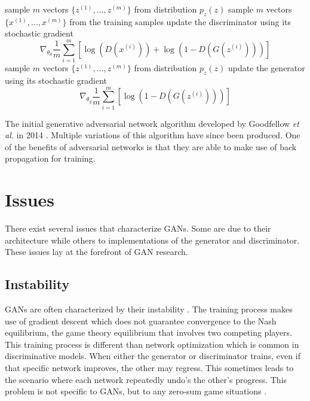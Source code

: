 \documentclass[11pt]{article}
\begin{document}
\begin{algorithm}[H]
  \SetAlgoLined
   \linebreak
   \linebreak
   {
     {
      sample $m$ vectors $\{z^{(1)},...,z^{(m)}\}$ from distribution $p_z(z)$\;
      sample $m$ vectors $\{x^{(1)},...,x^{(m)}\}$ from the training samples\;
      update the discriminator using its stochastic gradient
      $$\nabla_{\theta_d}\frac{1}{m}\sum_{i=1}^{m}[\log(D(x^{(i)}))+\log(1-D(G(z^{(i)})))]$$
    }
    sample $m$ vectors $\{z^{(1)},...,z^{(m)}\}$ from distribution $p_z(z)$\;
    update the generator using its stochastic gradient\;
    $$\nabla_{\theta_g}\frac{1}{m}\sum_{i=1}^{m}[\log(1-D(G(z^{(i)})))]$$
  }
  \caption{The initial generative adversarial network algorithm developed by Goodfellow \textit{et al.} in 2014 \citep{2014arXiv1406.2661G}. Multiple variations of this algorithm have since been produced. One of the benefits of adversarial networks is that they are able to make use of back propagation for training.}
\end{algorithm}



\section{Issues}
There exist several issues that characterize GANs. Some are due to their architecture while others to implementations of the generator and discriminator. These issues lay at the forefront of GAN research.

\subsection{Instability} \label{sec:instability}
GANs are often characterized by their instability \citep{2017arXiv170100160G}. The training process makes use of gradient descent which does not guarantee convergence to the Nash equilibrium, the game theory equilibrium that involves two competing players. This training process is different than network optimization which is common in discriminative models. When either the generator or discriminator trains, even if that specific network improves, the other may regress. This sometimes leads to the scenario where each network repeatedly undo's the other's progress. This problem is not specific to GANs, but to any zero-sum game situations \citep{2017arXiv170100160G}.
\end{document}
